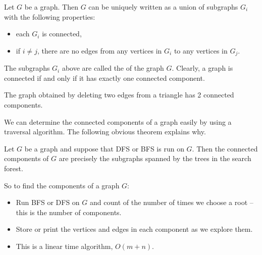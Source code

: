 \begin{Theorem} \label{thm:components}
Let $G$ be a graph. Then $G$ can be uniquely written as a union of
subgraphs $G_i$ with the following properties:
\begin{itemize}
  \item each $G_i$ is connected,
  \item if $i \neq j$, there are no edges from any vertices in $G_i$ 
  to any vertices in $G_j$.
\end{itemize}
\end{Theorem}

The subgraphs $G_i$ above are called the  of the graph $G$. 
Clearly, a graph is connected if and only if it has exactly one connected component.

\begin{Boxample} \label{eg:components}
The graph obtained by deleting two edges from a triangle has 2 connected components.
\end{Boxample}

We can determine the connected components of a graph easily by using a
traversal algorithm. The following obvious theorem explains why.

\begin{Theorem} \label{thm:trav-comps}
Let $G$ be a graph and suppose that DFS or BFS is run on $G$. Then the
connected components of $G$ are precisely the subgraphs spanned by the
trees in the search forest. 
\end{Theorem}

So to find the components of a graph $G$:
\begin{itemize}
\item Run BFS or DFS on $G$ and count of the number of times we choose a root -- this is the number of components.
\item Store or print the vertices and edges in each component as we explore them.
\item This is a linear time algorithm, $O(m+n)$.
\end{itemize}

